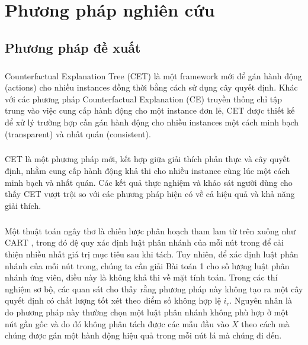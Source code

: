 \chapter{Phương pháp nghiên cứu}

\section{Phương pháp đề xuất}

\paragraph{} Counterfactual Explanation Tree (CET) là một framework mới để gán hành động (actions) cho nhiều instances đồng thời bằng cách sử dụng cây quyết định. Khác với các phương pháp Counterfactual Explanation (CE) truyền thống chỉ tập trung vào việc cung cấp hành động cho một instance đơn lẻ, CET được thiết kế để xử lý trường hợp cần gán hành động cho nhiều instances một cách minh bạch (transparent) và nhất quán (consistent).

\paragraph{} CET là một phương pháp mới, kết hợp giữa giải thích phản thực và cây quyết định, nhằm cung cấp hành động khả thi cho nhiều instance cùng lúc một cách minh bạch và nhất quán. Các kết quả thực nghiệm và khảo sát người dùng cho thấy CET vượt trội so với các phương pháp hiện có về cả hiệu quả và khả năng giải thích.

\paragraph{} Một thuật toán ngây thơ là chiến lược phân hoạch tham lam từ trên xuống như CART \parencite{breiman1984cart}, trong đó đệ quy xác định luật phân nhánh của mỗi nút trong để cải thiện nhiều nhất giá trị mục tiêu sau khi tách. Tuy nhiên, để xác định luật phân nhánh của mỗi nút trong, chúng ta cần giải Bài toán 1 cho số lượng luật phân nhánh ứng viên, điều này là không khả thi về mặt tính toán. Trong các thí nghiệm sơ bộ, các quan sát cho thấy rằng phương pháp này không tạo ra một cây quyết định có chất lượng tốt xét theo điểm số không hợp lệ \(i_r\). Nguyên nhân là do phương pháp này thường chọn một luật phân nhánh không phù hợp ở một nút gần gốc và do đó không phân tách được các mẫu đầu vào \(X\) theo cách mà chúng được gán một hành động hiệu quả trong mỗi nút lá mà chúng đi đến.  

